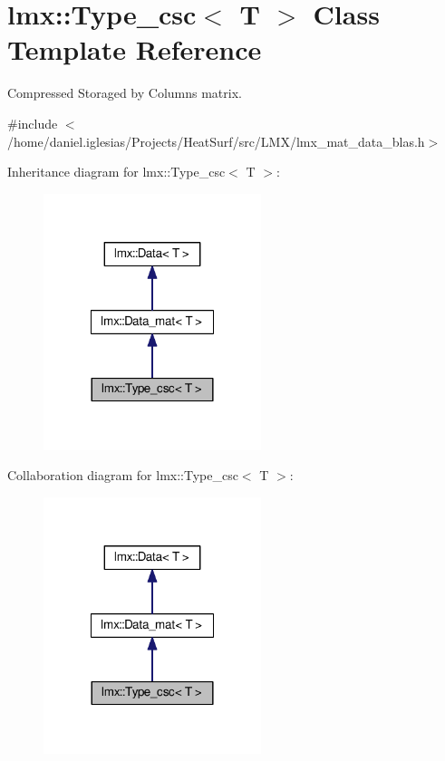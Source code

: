 \hypertarget{classlmx_1_1Type__csc}{\section{lmx\-:\-:Type\-\_\-csc$<$ T $>$ Class Template Reference}
\label{classlmx_1_1Type__csc}
}


Compressed Storaged by Columns matrix.  




{\ttfamily \#include $<$/home/daniel.\-iglesias/\-Projects/\-Heat\-Surf/src/\-L\-M\-X/lmx\-\_\-mat\-\_\-data\-\_\-blas.\-h$>$}



Inheritance diagram for lmx\-:\-:Type\-\_\-csc$<$ T $>$\-:
\nopagebreak
\begin{figure}[H]
\begin{center}
\leavevmode
\includegraphics[width=180pt]{classlmx_1_1Type__csc__inherit__graph}
\end{center}
\end{figure}


Collaboration diagram for lmx\-:\-:Type\-\_\-csc$<$ T $>$\-:
\nopagebreak
\begin{figure}[H]
\begin{center}
\leavevmode
\includegraphics[width=180pt]{classlmx_1_1Type__csc__coll__graph}
\end{center}
\end{figure}
